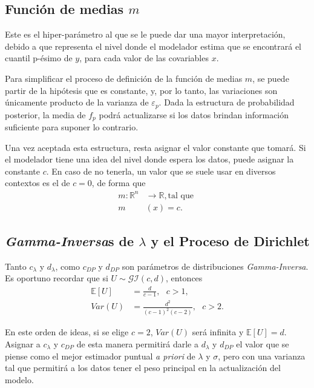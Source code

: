 \subsection{Funci\'on de medias $m$}

Este es el hiper-par\'ametro al que se le puede dar una mayor interpretaci\'on, debido a que representa el nivel donde el modelador estima que se encontrar\'a el cuantil p-\'esimo de $y$, para cada valor de las covariables $x$.

Para simplificar el proceso de definici\'on de la funci\'on de medias $m$, se puede partir de la hip\'otesis que es constante, y, por lo tanto, las variaciones son \'unicamente producto de la varianza de $\varepsilon_p$. Dada la estructura de probabilidad posterior, la media de $f_p$ podr\'a actualizarse si los datos brindan informaci\'on suficiente para suponer lo contrario. 

Una vez aceptada esta estructura, resta asignar el valor constante que tomar\'a. Si el modelador tiene una idea del nivel donde espera los datos, puede asignar la constante $c$. En caso de no tenerla, un valor que se suele usar en diversos contextos es el de $c=0$, de forma que
\begin{equation*}
\begin{aligned}
    m:\mathbb{R}^n &\rightarrow \mathbb{R}, \text{tal que }\\
    m&(x) = c.
\end{aligned}
\end{equation*}

\subsection{\textit{Gamma-Inversa}s de $\lambda$ y el Proceso de Dirichlet}

Tanto $c_\lambda$ y $d_\lambda$, como $c_{DP}$ y $d_{DP}$ son par\'ametros de distribuciones \textit{Gamma-Inversa}. Es oportuno recordar que si $U \sim \mathcal{GI}(c,d)$, entonces
\begin{equation*}
\begin{aligned}
    \mathbb{E}[U] &= \frac{d}{c-1}, \text{ } c>1,\\
    Var(U) &= \frac{d^2}{(c-1)^2(c-2)}, \text{ } c>2.
\end{aligned}
\end{equation*}

En este orden de ideas, si se elige $c = 2$, $Var(U)$ ser\'a infinita y $\mathbb{E}[U] = d$. Asignar a $c_\lambda$ y $c_{DP}$ de esta manera permitir\'a darle a $d_\lambda$ y $d_{DP}$ el valor que se piense como el mejor estimador puntual \textit{a priori} de $\lambda$ y $\sigma$, pero con una varianza tal que permitir\'a a los datos tener el peso principal en la actualizaci\'on del modelo. 

